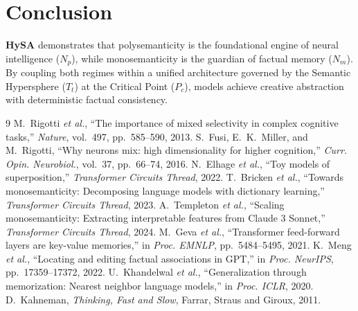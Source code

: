 \documentclass[10pt,twocolumn]{article}
\theoremstyle{definition}
\begin{document}
\section{Conclusion}
\textbf{HySA} demonstrates that polysemanticity is the foundational engine of neural intelligence ($N_p$), while monosemanticity is the guardian of factual memory ($N_m$). By coupling both regimes within a unified architecture governed by the Semantic Hypersphere ($T_t$) at the Critical Point ($P_c$), models achieve creative abstraction with deterministic factual consistency.

\begin{thebibliography}{9}
\footnotesize
{} M.~Rigotti \textit{et al.}, ``The importance of mixed selectivity in complex cognitive tasks,'' \textit{Nature}, vol.~497, pp.~585--590, 2013.
 S.~Fusi, E.~K.~Miller, and M.~Rigotti, ``Why neurons mix: high dimensionality for higher cognition,'' \textit{Curr. Opin. Neurobiol.}, vol.~37, pp.~66--74, 2016.
 N.~Elhage \textit{et al.}, ``Toy models of superposition,'' \textit{Transformer Circuits Thread}, 2022.
 T.~Bricken \textit{et al.}, ``Towards monosemanticity: Decomposing language models with dictionary learning,'' \textit{Transformer Circuits Thread}, 2023.
 A.~Templeton \textit{et al.}, ``Scaling monosemanticity: Extracting interpretable features from Claude 3 Sonnet,'' \textit{Transformer Circuits Thread}, 2024.
 M.~Geva \textit{et al.}, ``Transformer feed-forward layers are key-value memories,'' in \textit{Proc. EMNLP}, pp.~5484--5495, 2021.
 K.~Meng \textit{et al.}, ``Locating and editing factual associations in GPT,'' in \textit{Proc. NeurIPS}, pp.~17359--17372, 2022.
 U.~Khandelwal \textit{et al.}, ``Generalization through memorization: Nearest neighbor language models,'' in \textit{Proc. ICLR}, 2020.
 D.~Kahneman, \textit{Thinking, Fast and Slow}, Farrar, Straus and Giroux, 2011.
\end{thebibliography}
\end{document}
